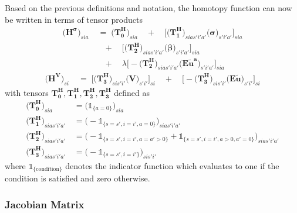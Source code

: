 \documentclass[11pt,fleqn]{article}
\newcommand{\bsigma}{\bm{\sigma}}
\newcommand{\bbeta}{\bm{\beta}}
\newcommand{\bV}{\bm{V}}
\newcommand{\tu}{\tilde{u}}
\newcommand{\id}{\mathds{1}}
\begin{document}
Based on the previous definitions and notation, the homotopy function can now be written in terms of tensor products
\begin{align*}
	\biggl( \bm{H^{\sigma}} \biggr)_{sia} &\;=\; 
		\biggl( \bm{T_0^H} \biggr)_{sia} \quad+\quad 
		\Biggl[ \biggl( \bm{T_1^H}\biggr)_{sias'i'a'} \biggl( \bsigma \biggr)_{s'i'a'} \Biggr]_{sia} \\
		&\quad+\quad \Biggl[ \biggl( \bm{T_2^H}\biggr)_{sias'i'a'} \biggl( \bbeta \biggr)_{s'i'a'} \Biggr]_{sia} \\
		&\quad+\quad \lambda \Biggl[ - \biggl( \bm{T_2^H}\biggr)_{sias'i'a'} \biggl( \bm{{E\tilde{u}^a}} \biggr)_{s'i'a'} \Biggr]_{sia}
\end{align*}
\begin{align*}
	\biggl( \bm{H^{V}} \biggr)_{si} &\;=\; 
		\Biggl[ \biggl( \bm{T_3^H}\biggr)_{sis'i'} \biggl( \bV \biggr)_{s'i'} \Biggr]_{si} \quad+\quad \Biggl[ - \biggl( \bm{T_3^H}\biggr)_{sis'i'} \biggl( \bm{{E\tu}} \biggr)_{s'i'} \Biggr]_{si} 
\end{align*}
with tensors $\boldsymbol{T_0^H}, \boldsymbol{T_1^H}, \boldsymbol{T_2^H}, \boldsymbol{T_3^H}$ defined as
\begin{align*}
	\biggl( \bm{T_0^H} \biggr)_{sia} \quad\;\;\: &= \biggl( \id_{\{a=0\}} \biggr)_{sia} \\
	\biggl( \bm{T_1^H} \biggr)_{sias'i'a'} &= \biggl( -\id_{\{s=s',i=i',a=0\}} \biggr)_{sias'i'a'} \\
	\biggl( \bm{T_2^H} \biggr)_{sias'i'a'} &= \biggl( -\id_{\{s=s',i=i',a=a'>0\}} + \id_{\{s=s',i=i',a>0,a'=0\}} \biggr)_{sias'i'a'} \\
	\biggl( \bm{T_3^H} \biggr)_{sias'i'a'} &= \biggl( -\id_{\{s=s',i=i'\}} \biggr)_{sis'i'}
\end{align*}
where $\id_{\{\text{condition}\}}$ denotes the indicator function which evaluates to one if the condition is satisfied and zero otherwise.


\subsubsection*{Jacobian Matrix}
\end{document}
